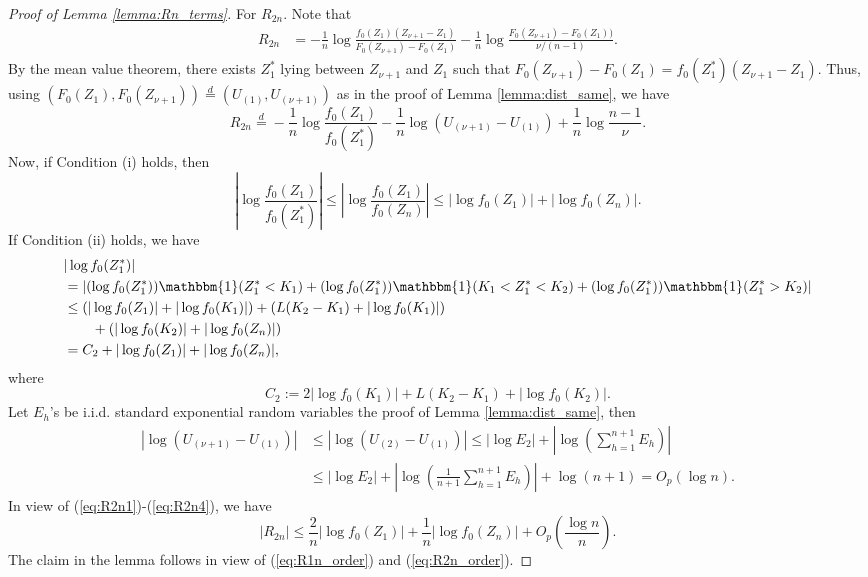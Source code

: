 \documentclass[12pt,letterpaper, twoside, openany]{article}
\theoremstyle{plain}
\begin{document}
\begin{proof}[Proof of Lemma \ref{lemma:Rn_terms}]
  For $R_{2n}$. Note that
\begin{align*}
	R_{2n} &= -\frac{1}{n} \log \frac{f_0(Z_1)(Z_{\nu+1} - Z_1)}{F_0(Z_{\nu+1})- F_0(Z_1)} - \frac{1}{n}\log \frac{F_0(Z_{\nu+1}) - F_0(Z_1))}{\nu/(n-1)}.
\end{align*}
By the mean value theorem, there exists $Z^*_1$ lying between $Z_{\nu+1}$ and $Z_1$ such that $F_0(Z_{\nu+1}) - F_0(Z_1) = f_0(Z^*_1)(Z_{\nu+1}-Z_1)$. Thus, using $(F_0(Z_1), F_0(Z_{\nu+1})) \stackrel{d}{=} (U_{(1)}, U_{(\nu+1)}) $ as in the proof of Lemma \ref{lemma:dist_same}, we have
\begin{equation}\label{eq:R2n1}
	R_{2n} \stackrel{d}{=}  -\frac{1}{n}\log \frac{f_0(Z_1)}{f_0(Z^*_1)} - \frac{1}{n} \log (U_{(\nu+1)} - U_{(1)}) + \frac{1}{n} \log \frac{n-1}{\nu}.
\end{equation}
Now, if Condition (i) holds, then 
\begin{equation}\label{eq:R2n2}
\left|	\log \frac{f_0(Z_1)}{f_0(Z^*_1)} \right| \leq \left|	\log \frac{f_0(Z_1)}{f_0(Z_n)} \right| \leq |\log f_0(Z_1)|+ |\log f_0(Z_n)|.
\end{equation}
If Condition (ii) holds, we have
\begin{align}
&	|\log f_0(Z^*_1)| \nonumber\\
 &= |(\log f_0(Z^*_1))\mathbbm{1}(Z^*_1 < K_1)  +
	(\log f_0(Z^*_1))\mathbbm{1}(K_1 < Z^*_1 < K_2) + (\log f_0(Z^*_1))\mathbbm{1}(Z^*_1 > K_2)| \nonumber \\
	& \leq (|\log f_0(Z_1)| + |\log f_0(K_1)|) + (L(K_2 - K_1) + |\log f_0(K_1)|) \nonumber \\
	& \quad \quad  + (|\log f_0(K_2)| + |\log f_0(Z_n)|)  \nonumber \\
	& =C_2 + |\log f_0(Z_1)| + |\log f_0(Z_n)|, \label{eq:R2n3}
\end{align}
where
\begin{equation*}
	C_2:= 2 |\log f_0(K_1)| + L(K_2-K_1) + |\log f_0(K_2)|.
\end{equation*}
Let $E_h$'s be i.i.d. standard exponential random variables the proof of Lemma \ref{lemma:dist_same}, then
\begin{align}
	|\log (U_{(\nu+1)} - U_{(1)})| & \leq |\log (U_{(2)} - U_{(1)})| \leq |\log E_2| + \left| \log \left( \sum^{n+1}_{h=1} E_h\right)\right|\nonumber\\
 &\leq |\log E_2| + \left| \log \left( \frac{1}{n+1}\sum^{n+1}_{h=1} E_h\right) \right|  + \log (n+1)= O_p(\log n).  \label{eq:R2n4}
\end{align}
In view of (\ref{eq:R2n1})-(\ref{eq:R2n4}), we have
\begin{equation}\label{eq:R2n_order}
\left|	R_{2n }\right| \leq \frac{2}{n} |\log f_0(Z_1)| + \frac{1}{n}|\log f_0(Z_n)| + O_p\left(\frac{\log n}{n}\right).
\end{equation}
The claim in the lemma follows in view of (\ref{eq:R1n_order}) and (\ref{eq:R2n_order}).
\end{proof}
\end{document}
